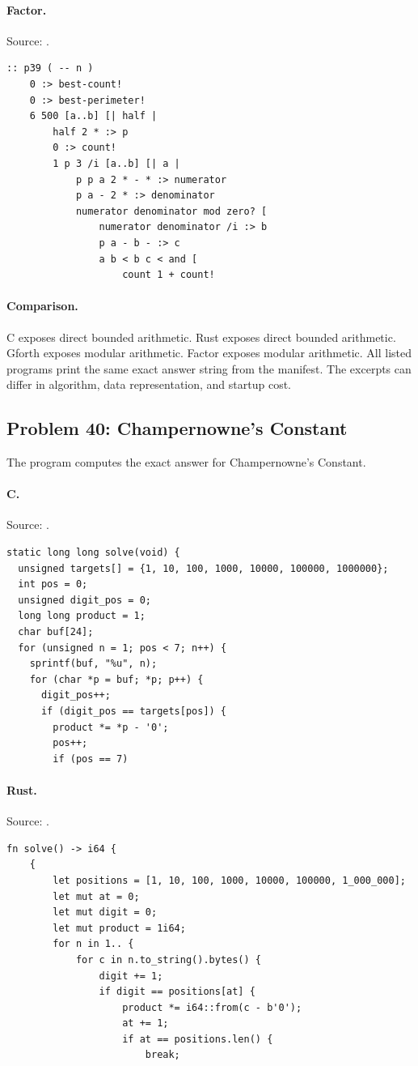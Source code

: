 \paragraph{Factor.} Source: .
\begin{lstlisting}
:: p39 ( -- n )
    0 :> best-count!
    0 :> best-perimeter!
    6 500 [a..b] [| half |
        half 2 * :> p
        0 :> count!
        1 p 3 /i [a..b] [| a |
            p p a 2 * - * :> numerator
            p a - 2 * :> denominator
            numerator denominator mod zero? [
                numerator denominator /i :> b
                p a - b - :> c
                a b < b c < and [
                    count 1 + count!
\end{lstlisting}

\paragraph{Comparison.}
C exposes direct bounded arithmetic. Rust exposes direct bounded arithmetic. Gforth exposes modular arithmetic. Factor exposes modular arithmetic.
All listed programs print the same exact answer string from the manifest. The excerpts can differ in algorithm, data representation, and startup cost.

\subsection{Problem 40: Champernowne's Constant}
\label{walkthrough:p40}
The program computes the exact answer for Champernowne's Constant.

\paragraph{C.} Source: .
\begin{lstlisting}
static long long solve(void) {
  unsigned targets[] = {1, 10, 100, 1000, 10000, 100000, 1000000};
  int pos = 0;
  unsigned digit_pos = 0;
  long long product = 1;
  char buf[24];
  for (unsigned n = 1; pos < 7; n++) {
    sprintf(buf, "%u", n);
    for (char *p = buf; *p; p++) {
      digit_pos++;
      if (digit_pos == targets[pos]) {
        product *= *p - '0';
        pos++;
        if (pos == 7)
\end{lstlisting}

\paragraph{Rust.} Source: .
\begin{lstlisting}
fn solve() -> i64 {
    {
        let positions = [1, 10, 100, 1000, 10000, 100000, 1_000_000];
        let mut at = 0;
        let mut digit = 0;
        let mut product = 1i64;
        for n in 1.. {
            for c in n.to_string().bytes() {
                digit += 1;
                if digit == positions[at] {
                    product *= i64::from(c - b'0');
                    at += 1;
                    if at == positions.len() {
                        break;
\end{lstlisting}

